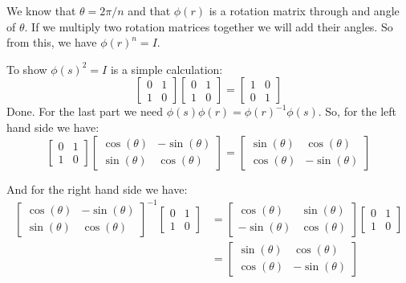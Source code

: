 \documentclass[12pt]{report}
\begin{document}
\begin{enumerate}
\begin{itemize}
        We know that $\theta = 2\pi/n$ and that $\phi(r)$ is a rotation matrix
        through and angle of $\theta$. If we multiply two rotation matrices
        together we will add their angles. So from this, we have $\phi(r)^n=I$.

        To show $\phi(s)^2 = I$ is a simple calculation:
        $$
        \begin{bmatrix}
          0 & 1\\
          1 & 0
        \end{bmatrix}
        \begin{bmatrix}
          0 & 1\\
          1 & 0
        \end{bmatrix}
        =
        \begin{bmatrix}
          1 & 0\\
          0 & 1
        \end{bmatrix}
        $$
        Done. For the last part we need $\phi(s)\phi(r) = \phi(r)^{-1}\phi(s)$.
        So, for the left hand side we have:
        $$
        \begin{bmatrix}
          0 & 1\\
          1 & 0
        \end{bmatrix}
        \begin{bmatrix}
          \cos(\theta) & -\sin(\theta)\\
          \sin(\theta) & \cos(\theta)
        \end{bmatrix}
        =
        \begin{bmatrix}
          \sin(\theta) & \cos(\theta)\\
          \cos(\theta) & -\sin(\theta)
        \end{bmatrix}
        $$

        And for the right hand side we have:
      \begin{align*}
        \begin{bmatrix}
          \cos(\theta) & -\sin(\theta)\\
          \sin(\theta) & \cos(\theta)
        \end{bmatrix}^{-1}
        \begin{bmatrix}
          0 & 1\\
          1 & 0
        \end{bmatrix}
        &=
        \begin{bmatrix}
           \cos(\theta) & \sin(\theta)\\
          -\sin(\theta) & \cos(\theta)
        \end{bmatrix}
        \begin{bmatrix}
          0 & 1\\
          1 & 0
        \end{bmatrix}\\
        &=
        \begin{bmatrix}
          \sin(\theta) & \cos(\theta)\\
          \cos(\theta) & -\sin(\theta)
        \end{bmatrix}
      \end{align*}


\end{itemize}
\end{enumerate}
\end{document}
